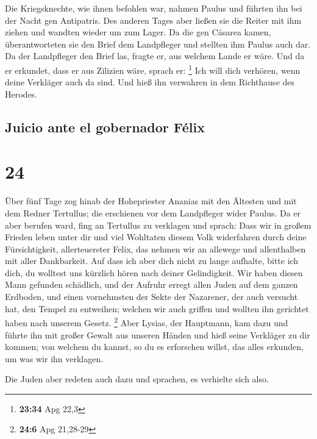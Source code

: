  Die Kriegsknechte, wie ihnen befohlen war, nahmen Paulus
und führten ihn bei der Nacht gen Antipatris.  Des
anderen Tages aber ließen sie die Reiter mit ihm ziehen und wandten
wieder um zum Lager.  Da die gen Cäsarea kamen,
überantworteten sie den Brief dem Landpfleger und stellten ihm Paulus
auch dar.  Da der Landpfleger den Brief las, fragte er,
aus welchem Lande er wäre. Und da er erkundet, dass er aus Zilizien
wäre, sprach er: \footnote{\textbf{23:34} Apg 22,3}  Ich
will dich verhören, wenn deine Verkläger auch da sind. Und hieß ihn
verwahren in dem Richthause des Herodes.

\hypertarget{juicio-ante-el-gobernador-fuxe9lix}{%
\subsection{Juicio ante el gobernador
Félix}\label{juicio-ante-el-gobernador-fuxe9lix}}

\hypertarget{section-23}{%
\section{24}\label{section-23}}

 Über fünf Tage zog hinab der Hohepriester Ananias mit den
Ältesten und mit dem Redner Tertullus; die erschienen vor dem
Landpfleger wider Paulus.  Da er aber berufen ward, fing
an Tertullus zu verklagen und sprach:  Dass wir in großem
Frieden leben unter dir und viel Wohltaten diesem Volk widerfahren durch
deine Fürsichtigkeit, allerteuerster Felix, das nehmen wir an allewege
und allenthalben mit aller Dankbarkeit.  Auf dass ich aber
dich nicht zu lange aufhalte, bitte ich dich, du wolltest uns kürzlich
hören nach deiner Gelindigkeit.  Wir haben diesen Mann
gefunden schädlich, und der Aufruhr erregt allen Juden auf dem ganzen
Erdboden, und einen vornehmsten der Sekte der Nazarener, 
der auch versucht hat, den Tempel zu entweihen; welchen wir auch griffen
und wollten ihn gerichtet haben nach unserem Gesetz. \footnote{\textbf{24:6}
  Apg 21,28-29}  Aber Lysias, der Hauptmann, kam dazu und
führte ihn mit großer Gewalt aus unseren Händen  und hieß
seine Verkläger zu dir kommen; von welchem du kannst, so du es
erforschen willst, das alles erkunden, um was wir ihn verklagen.

 Die Juden aber redeten auch dazu und sprachen, es
verhielte sich also.

